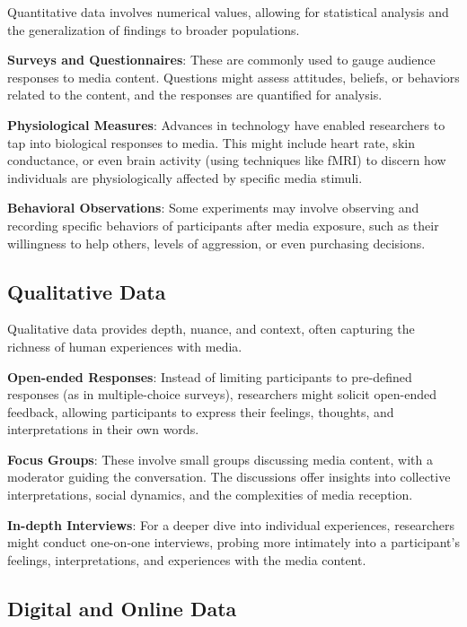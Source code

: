 \documentclass[
  b5paper]{book}
\begin{document}
Quantitative data involves numerical values, allowing for statistical analysis and the generalization of findings to broader populations.

\textbf{Surveys and Questionnaires}: These are commonly used to gauge audience responses to media content. Questions might assess attitudes, beliefs, or behaviors related to the content, and the responses are quantified for analysis.

\textbf{Physiological Measures}: Advances in technology have enabled researchers to tap into biological responses to media. This might include heart rate, skin conductance, or even brain activity (using techniques like fMRI) to discern how individuals are physiologically affected by specific media stimuli.

\textbf{Behavioral Observations}: Some experiments may involve observing and recording specific behaviors of participants after media exposure, such as their willingness to help others, levels of aggression, or even purchasing decisions.

\hypertarget{qualitative-data}{%
\subsection*{Qualitative Data}\label{qualitative-data}}

Qualitative data provides depth, nuance, and context, often capturing the richness of human experiences with media.

\textbf{Open-ended Responses}: Instead of limiting participants to pre-defined responses (as in multiple-choice surveys), researchers might solicit open-ended feedback, allowing participants to express their feelings, thoughts, and interpretations in their own words.

\textbf{Focus Groups}: These involve small groups discussing media content, with a moderator guiding the conversation. The discussions offer insights into collective interpretations, social dynamics, and the complexities of media reception.

\textbf{In-depth Interviews}: For a deeper dive into individual experiences, researchers might conduct one-on-one interviews, probing more intimately into a participant's feelings, interpretations, and experiences with the media content.

\hypertarget{digital-and-online-data}{%
\subsection*{Digital and Online Data}\label{digital-and-online-data}}
\end{document}
